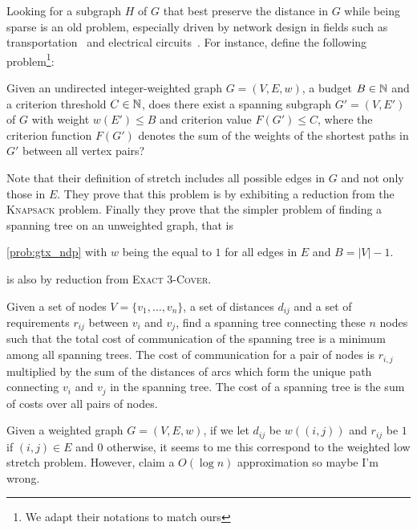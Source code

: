 Looking for a subgraph $H$ of $G$ that best preserve the distance in $G$ while being sparse is an old
problem, especially driven by network design in fields such as transportation~\autocite{RoadNetworks60}
and electrical circuits~\autocite{electricalNetworks60}. For instance, \textcite{Johnson1978} define
the following problem\footnote{We adapt their notations to match ours}:  
\begin{problem}
  \label{prob:gtx_ndp}
  Given an undirected integer-weighted graph $G=(V, E, w)$, a budget $B\in\mathbb{N}$ and a criterion
  threshold $C\in \mathbb{N}$, does there exist a spanning subgraph $G'=(V, E')$ of $G$ with weight
  $w(E') \leq B$ and criterion value $F(G') \leq C$, where the criterion function $F(G')$ denotes
  the sum of the weights of the shortest paths in $G'$ between all vertex pairs?
\end{problem}
Note that their definition of stretch includes all possible edges in $G$ and not only those in $E$.
They prove that this problem is \NPc{} by exhibiting a reduction from the \textsc{Knapsack}
problem. Finally they prove that the simpler problem of finding a spanning tree on an unweighted
graph, that is
\vspace{-.5\baselineskip}
\begin{problem}
  \autoref{prob:gtx_ndp} with $w$ being the equal to $1$ for all edges in $E$ and $B=|V|-1$.
\end{problem}%
\vspace{-.5\baselineskip}
\noindent is also \NPc{} by reduction from \textsc{Exact 3-Cover}.

\begin{problem}
Given a set of nodes $V=\{v_1, \ldots, v_n\}$, a set of distances $d_{ij}$ and a set of requirements
$r_{ij}$ between $v_i$ and $v_j$, find a spanning tree connecting these $n$ nodes such that the
total cost of communication of the spanning tree is a minimum among all spanning trees. The cost of
communication for a pair of nodes is $r_{i,j}$ multiplied by the sum of the distances of arcs which
form the unique path connecting $v_i$ and $v_j$ in the spanning tree. The cost of a spanning tree is
the sum of costs over all pairs of nodes.
\end{problem}

Given a weighted graph $G=(V,E,w)$, if we let $d_{ij}$ be $w((i,j))$ and $r_{ij}$ be $1$ if
$(i,j)\in E$ and $0$ otherwise, it seems to me this correspond to the weighted low stretch problem.
However, \textcite[Section 3, page 453]{lognMetricBoundConf03} claim a $O(\log n)$ approximation so maybe I'm
wrong.

